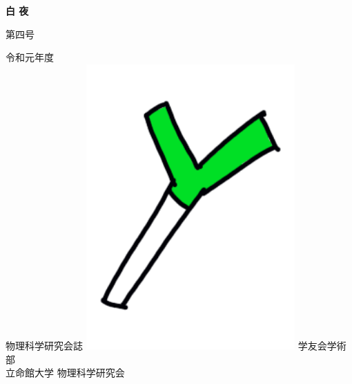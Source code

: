\documentclass[10pt,b5paper,papersize,dvipdfmx]{jsbook}
\begin{document}
\thispagestyle{empty}



\begin{center}
  {\fontsize{90}{0}\selectfont \bfseries 白 夜}
%
  \begin{flushright}
    \vspace{-6zw}
    {\fontsize{18}{0}\selectfont \mcfamily
            第四号
    \hspace{.5zw}\vspace{-1zw}}
    \vspace{6zw}
  \end{flushright}
%
  \vspace{-1zw}
  {\fontsize{13}{0}\selectfont \mcfamily
            令和元年度 \\ 
            物理科学研究会誌
  }
%
  \vfill
  \includegraphics[width=0.6\textwidth]{img/negi.png}
  \vfill
  {\fontsize{13}{0}\selectfont \mcfamily
            学友会学術部 \\ %
            立命館大学 物理科学研究会
  }
\end{center}
\end{document}
